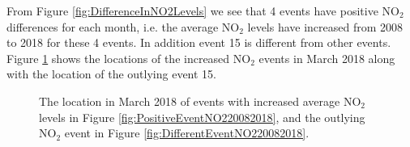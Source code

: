 \documentclass[11pt]{article}
\begin{document}
	From Figure \ref{fig:DifferenceInNO2Levels} we see that 4 events have positive $\text{NO}_2$ differences for each month, i.e. the average $\text{NO}_2$ levels have increased from 2008 to 2018 for these 4 events. In addition event 15 is different from other events. Figure \ref{fig:PositiveDifferentEventsNO220082018} shows the  locations of the increased $\text{NO}_2$ events in March 2018 along with the  location of the outlying event 15. 
	 	
	\begin{figure}[H]
		\centering
		\caption{\footnotesize The location in March 2018 of events with increased  average $\text{NO}_2$ levels in Figure \ref{fig:PositiveEventNO220082018}, and the outlying $\text{NO}_2$ event in Figure \ref{fig:DifferentEventNO220082018}. }
		\label{fig:PositiveDifferentEventsNO220082018}
	\end{figure}
\end{document}
